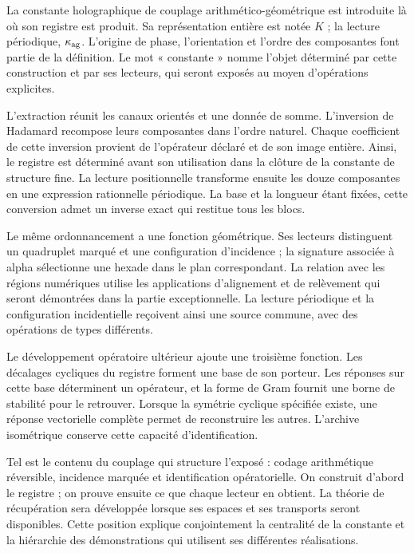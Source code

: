 
La constante holographique de couplage arithmético-géométrique est introduite
là où son registre est produit. Sa représentation entière est notée
\(K\) ; la lecture périodique, \(\kappa_{\rm ag}\). L’origine de
phase, l’orientation et l’ordre des composantes font partie de la
définition. Le mot « constante » nomme l’objet déterminé par cette
construction et par ses lecteurs, qui seront exposés au moyen d’opérations
explicites.

L'extraction réunit les canaux orientés et une donnée de somme. L'inversion de Hadamard recompose leurs composantes dans l'ordre naturel. Chaque coefficient de cette inversion provient de l'opérateur déclaré et de son image entière. Ainsi, le registre est déterminé avant son utilisation dans la clôture de la constante de structure fine. La lecture positionnelle transforme ensuite les douze composantes en une expression rationnelle périodique. La base et la longueur étant fixées, cette conversion admet un inverse exact qui restitue tous les blocs.

Le même ordonnancement a une fonction géométrique. Ses lecteurs distinguent
un quadruplet marqué et une configuration d’incidence ; la signature associée
à alpha sélectionne une hexade dans le plan correspondant. La
relation avec les régions numériques utilise les applications
d’alignement et de relèvement qui seront démontrées dans la partie exceptionnelle.
La lecture périodique et la configuration incidentielle reçoivent ainsi une
source commune, avec des opérations de types différents.

Le développement opératoire ultérieur ajoute une troisième fonction. Les
décalages cycliques du registre forment une base de son porteur. Les
réponses sur cette base déterminent un opérateur, et la forme de Gram
fournit une borne de stabilité pour le retrouver. Lorsque la
symétrie cyclique spécifiée existe, une réponse vectorielle complète permet de
reconstruire les autres. L’archive isométrique conserve cette capacité
d’identification.

Tel est le contenu du couplage qui structure l'exposé : codage arithmétique réversible, incidence marquée et identification opératorielle. On construit d'abord le registre ; on prouve ensuite ce que chaque lecteur en obtient. La théorie de récupération sera développée lorsque ses espaces et ses transports seront disponibles. Cette position explique conjointement la centralité de la constante et la hiérarchie des démonstrations qui utilisent ses différentes réalisations.

